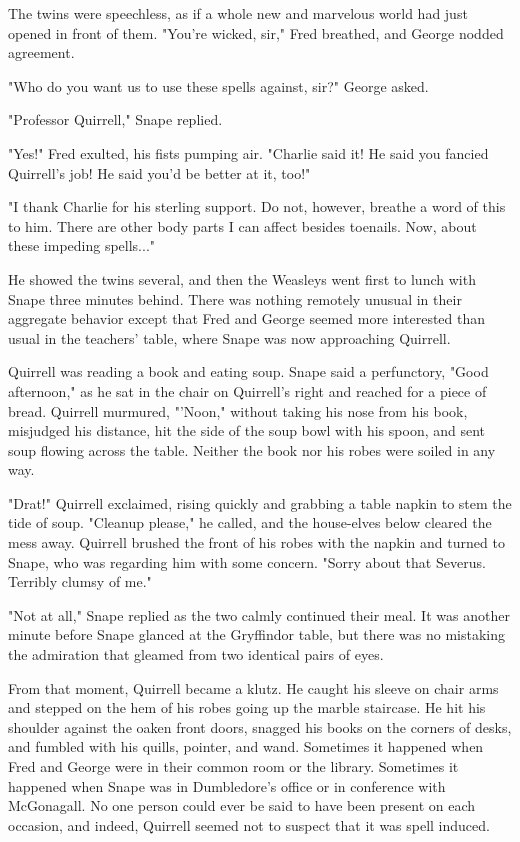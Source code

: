 \documentclass[a4paper,11pt]{article}
\begin{document}
The twins were speechless, as if a whole new and marvelous world had just opened in front of them. "You're wicked, sir," Fred breathed, and George nodded agreement.

"Who do you want us to use these spells against, sir?" George asked.

"Professor Quirrell," Snape replied.

"Yes!" Fred exulted, his fists pumping air. "Charlie said it! He said you fancied Quirrell's job! He said you'd be better at it, too!"

"I thank Charlie for his sterling support. Do not, however, breathe a word of this to him. There are other body parts I can affect besides toenails. Now, about these impeding spells..."

He showed the twins several, and then the Weasleys went first to lunch with Snape three minutes behind. There was nothing remotely unusual in their aggregate behavior except that Fred and George seemed more interested than usual in the teachers' table, where Snape was now approaching Quirrell.

Quirrell was reading a book and eating soup. Snape said a perfunctory, "Good afternoon," as he sat in the chair on Quirrell's right and reached for a piece of bread. Quirrell murmured, "'Noon," without taking his nose from his book, misjudged his distance, hit the side of the soup bowl with his spoon, and sent soup flowing across the table. Neither the book nor his robes were soiled in any way.

"Drat!" Quirrell exclaimed, rising quickly and grabbing a table napkin to stem the tide of soup. "Cleanup please," he called, and the house-elves below cleared the mess away. Quirrell brushed the front of his robes with the napkin and turned to Snape, who was regarding him with some concern. "Sorry about that Severus. Terribly clumsy of me."

"Not at all," Snape replied as the two calmly continued their meal. It was another minute before Snape glanced at the Gryffindor table, but there was no mistaking the admiration that gleamed from two identical pairs of eyes.

From that moment, Quirrell became a klutz. He caught his sleeve on chair arms and stepped on the hem of his robes going up the marble staircase. He hit his shoulder against the oaken front doors, snagged his books on the corners of desks, and fumbled with his quills, pointer, and wand. Sometimes it happened when Fred and George were in their common room or the library. Sometimes it happened when Snape was in Dumbledore's office or in conference with McGonagall. No one person could ever be said to have been present on each occasion, and indeed, Quirrell seemed not to suspect that it was spell induced.
\end{document}
